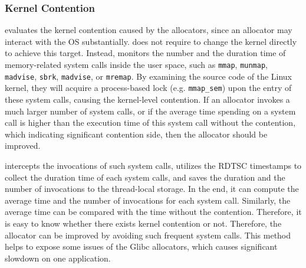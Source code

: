 
\subsubsection{Kernel Contention}
\MP{} evaluates the kernel contention caused by the allocators, since an allocator may interact with the OS substantially. \MP{} does not require to change the kernel directly to achieve this target. Instead, \MP{} monitors the number and the duration time of memory-related system calls inside the user space, such as \texttt{mmap}, \texttt{munmap}, \texttt{madvise}, \texttt{sbrk}, \texttt{madvise}, or \texttt{mremap}. By examining the source code of the Linux kernel, they will acquire a process-based lock (e.g. \texttt{mmap\_sem}) upon the entry of these system calls, causing the kernel-level contention. If an allocator invokes a much larger number of system calls,  or if the average time spending on a system call is higher than the execution time of this system call without the contention, which indicating significant contention side, then the allocator should be improved. 

\MP{} intercepts the invocations of such system calls, utilizes the RDTSC timestamps to collect the duration time of each system calls, and saves the duration and the number of invocations to the thread-local storage. In the end, it can compute the average time and the number of invocations for each system call. Similarly, the average time can be compared with the time without the contention. Therefore, it is easy to know whether there exists kernel contention or not. Therefore, the allocator can be improved by avoiding such frequent system calls. This method helps to expose some issues of the Glibc allocators, which causes significant slowdown on one application. 

  

